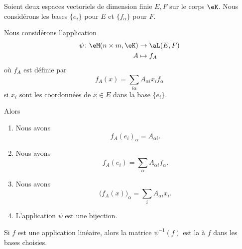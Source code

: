 \begin{propositionDef}      \label{PROPooGXDBooHfKRrv}
    Soient deux espaces vectoriels de dimension finie \( E,F\) sur le corps \( \eK\). Nous considérons les bases \( \{ e_i \}\) pour \( E\) et \( \{ f_{\alpha} \}\) pour \( F\). 

    Nous considérons l'application
    \begin{equation}
        \begin{aligned}
            \psi\colon \eM(n\times m, \eK)&\to \aL(E,F) \\
            A&\mapsto f_A 
        \end{aligned}
    \end{equation}
    où \( f_A\) est définie par
    \begin{equation}        \label{EQooZKEKooNYjvhP}
        f_A(x)=\sum_{i\alpha}A_{\alpha i}x_if_{\alpha}
    \end{equation}
    si \( x_i\) sont les coordonnées de \( x\in E\) dans la base \( \{ e_i \}\).

    Alors
    \begin{enumerate}
        \item       \label{ITEMooKZYYooZPTkpq}
            Nous avons
            \begin{equation}
                f_A(e_i)_{\alpha}=A_{\alpha i}.
            \end{equation}
        \item       \label{ITEMooANXFooGIuxUR}
            Nous avons
            \begin{equation}                \label{EQooOKOJooYgteNP}
                f_A(e_i)=\sum_{\alpha}A_{\alpha i}f_{\alpha}.
            \end{equation}
        \item       \label{ITEMooXLLLooKfigfB}
            Nous avons
            \begin{equation}        \label{EQooAXRJooUwHbjB}
                \big( f_A(x) \big)_{\alpha}=\sum_{i}A_{\alpha i}x_i.
            \end{equation}
        \item       \label{ITEMooHSMLooRJZref}
            L'application \( \psi\) est une bijection.
    \end{enumerate}
    Si \( f\) est une application linéaire, alors la matrice \( \psi^{-1}(f)\) est la  à \( f\) dans les bases choisies.
\end{propositionDef}


